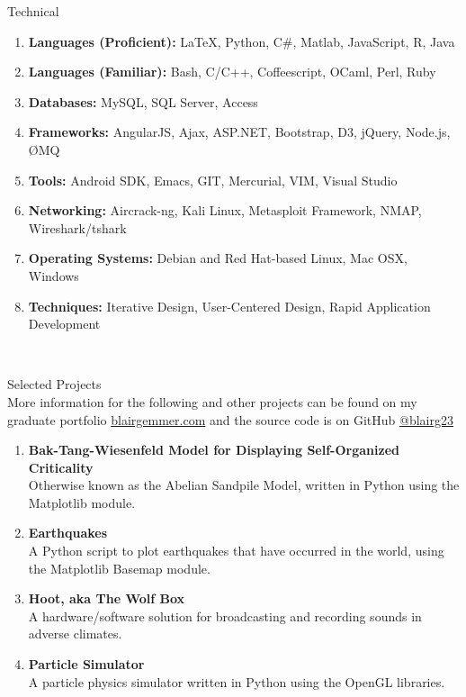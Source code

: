\documentclass[oneside]{article}%
\begin{document}
\newpage
\noindent
\huge{Technical}
\normalsize
\begin{enumerate}[]
	\item \textbf{Languages (Proficient):} \LaTeX, Python, C\#, Matlab, JavaScript, R, Java
	\item \textbf{Languages (Familiar):} Bash, C/C++, Coffeescript, OCaml, Perl, Ruby
	\item \textbf{Databases:} MySQL, SQL Server, Access
	\item \textbf{Frameworks:} AngularJS, Ajax, ASP.NET, Bootstrap, D3, jQuery, Node.js, ØMQ
	\item \textbf{Tools:} Android SDK, Emacs, GIT, Mercurial, VIM, Visual Studio
	\item \textbf{Networking:} Aircrack-ng, Kali Linux, Metasploit Framework, NMAP, Wireshark/tshark
	\item \textbf{Operating Systems:} Debian and Red Hat-based Linux, Mac OSX, Windows
	\item \textbf{Techniques:} Iterative Design, User-Centered Design, Rapid Application Development
\end{enumerate}

\

\noindent
\huge{Selected Projects}\\
\normalsize
More information for the following and other projects can be found on my graduate portfolio \href{blairgemmer.com}{blairgemmer.com} and the source code is on GitHub \href{https://github.com/blairg23}{@blairg23}
\begin{enumerate}[]
	\item \textbf{Bak-Tang-Wiesenfeld Model for Displaying Self-Organized\\ Criticality}\\
		Otherwise known as the Abelian Sandpile Model, written in Python using the Matplotlib module.
	\item \textbf{Earthquakes}\\
		A Python script to plot earthquakes that have occurred in the world, using the Matplotlib Basemap module.
	\item \textbf{Hoot, aka The Wolf Box}\\
		A hardware/software solution for broadcasting and recording sounds in adverse climates.
	\item \textbf{Particle Simulator}\\
		A particle physics simulator written in Python using the OpenGL libraries.
\end{enumerate}
\end{document}
